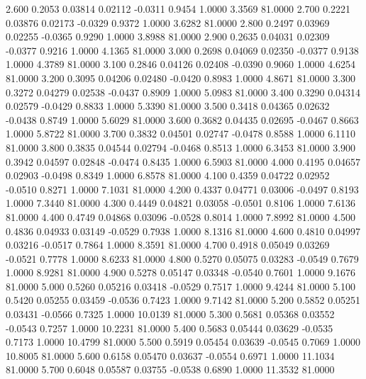    2.600   0.2053   0.03814   0.02112  -0.0311   0.9454   1.0000   3.3569  81.0000
   2.700   0.2221   0.03876   0.02173  -0.0329   0.9372   1.0000   3.6282  81.0000
   2.800   0.2497   0.03969   0.02255  -0.0365   0.9290   1.0000   3.8988  81.0000
   2.900   0.2635   0.04031   0.02309  -0.0377   0.9216   1.0000   4.1365  81.0000
   3.000   0.2698   0.04069   0.02350  -0.0377   0.9138   1.0000   4.3789  81.0000
   3.100   0.2846   0.04126   0.02408  -0.0390   0.9060   1.0000   4.6254  81.0000
   3.200   0.3095   0.04206   0.02480  -0.0420   0.8983   1.0000   4.8671  81.0000
   3.300   0.3272   0.04279   0.02538  -0.0437   0.8909   1.0000   5.0983  81.0000
   3.400   0.3290   0.04314   0.02579  -0.0429   0.8833   1.0000   5.3390  81.0000
   3.500   0.3418   0.04365   0.02632  -0.0438   0.8749   1.0000   5.6029  81.0000
   3.600   0.3682   0.04435   0.02695  -0.0467   0.8663   1.0000   5.8722  81.0000
   3.700   0.3832   0.04501   0.02747  -0.0478   0.8588   1.0000   6.1110  81.0000
   3.800   0.3835   0.04544   0.02794  -0.0468   0.8513   1.0000   6.3453  81.0000
   3.900   0.3942   0.04597   0.02848  -0.0474   0.8435   1.0000   6.5903  81.0000
   4.000   0.4195   0.04657   0.02903  -0.0498   0.8349   1.0000   6.8578  81.0000
   4.100   0.4359   0.04722   0.02952  -0.0510   0.8271   1.0000   7.1031  81.0000
   4.200   0.4337   0.04771   0.03006  -0.0497   0.8193   1.0000   7.3440  81.0000
   4.300   0.4449   0.04821   0.03058  -0.0501   0.8106   1.0000   7.6136  81.0000
   4.400   0.4749   0.04868   0.03096  -0.0528   0.8014   1.0000   7.8992  81.0000
   4.500   0.4836   0.04933   0.03149  -0.0529   0.7938   1.0000   8.1316  81.0000
   4.600   0.4810   0.04997   0.03216  -0.0517   0.7864   1.0000   8.3591  81.0000
   4.700   0.4918   0.05049   0.03269  -0.0521   0.7778   1.0000   8.6233  81.0000
   4.800   0.5270   0.05075   0.03283  -0.0549   0.7679   1.0000   8.9281  81.0000
   4.900   0.5278   0.05147   0.03348  -0.0540   0.7601   1.0000   9.1676  81.0000
   5.000   0.5260   0.05216   0.03418  -0.0529   0.7517   1.0000   9.4244  81.0000
   5.100   0.5420   0.05255   0.03459  -0.0536   0.7423   1.0000   9.7142  81.0000
   5.200   0.5852   0.05251   0.03431  -0.0566   0.7325   1.0000  10.0139  81.0000
   5.300   0.5681   0.05368   0.03552  -0.0543   0.7257   1.0000  10.2231  81.0000
   5.400   0.5683   0.05444   0.03629  -0.0535   0.7173   1.0000  10.4799  81.0000
   5.500   0.5919   0.05454   0.03639  -0.0545   0.7069   1.0000  10.8005  81.0000
   5.600   0.6158   0.05470   0.03637  -0.0554   0.6971   1.0000  11.1034  81.0000
   5.700   0.6048   0.05587   0.03755  -0.0538   0.6890   1.0000  11.3532  81.0000
